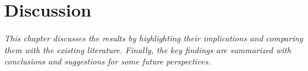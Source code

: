 ﻿%

%

\chapter{Discussion}
\label{cha:discussion}

\textit{This chapter discusses the results by highlighting their implications and comparing them with the existing literature. Finally, the key findings are summarized with conclusions and suggestions for some future perspectives.}

